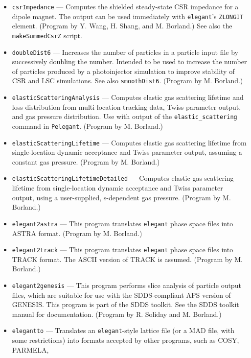 \documentclass[11pt]{article}
\begin{document}
\begin{itemize}
  (Program by X. Dong.)
\item {\tt csrImpedance} --- Computes the shielded steady-state CSR impedance for a dipole magnet.
 The output can be used immediately with {\tt elegant}'s \verb|ZLONGIT| element.
 (Program by Y. Wang, H. Shang, and M. Borland.)
 See also the {\tt makeSummedCsrZ} script.
\item {\tt doubleDist6} --- Increases the number of particles in a particle input file by
 successively doubling the number.  Intended to be used to increase the number of particles
 produced by a photoinjector simulation to improve stability of CSR and LSC simulations.
 See also {\tt smoothDist6}.
  (Program by M. Borland.)
\item {\tt elasticScatteringAnalysis} --- Computes elastic gas scattering lifetime and loss distribution from
  multi-location tracking data, Twiss parameter output, and gas pressure distribution. Use with output of the
  \verb|elastic_scattering| command in \verb|Pelegant|.
  (Program by M. Borland.)
\item {\tt elasticScatteringLifetime} --- Computes elastic gas scattering lifetime from single-location 
  dynamic acceptance and Twiss parameter output, assuming a constant gas pressure.
  (Program by M. Borland.)
\item {\tt elasticScatteringLifetimeDetailed} --- Computes elastic gas scattering lifetime from single-location 
  dynamic acceptance and Twiss parameter output, using a user-supplied, s-dependent gas pressure.
  (Program by M. Borland.)
\item {\tt elegant2astra} --- This program translates {\tt elegant} phase space files into ASTRA \cite{ASTRA} format.
  (Program by M. Borland.)
\item {\tt elegant2track} --- This program translates {\tt elegant} phase space files into TRACK \cite{TRACK} format.
  The ASCII version of TRACK is assumed.
  (Program by M. Borland.)
\item {\tt elegant2genesis} --- This program performs
        slice analysis of particle output files, which are suitable for use with
        the SDDS-compliant APS version of GENESIS\cite{GENESIS}.  This program is
        part of the SDDS toolkit.  See the SDDS toolkit
        manual for documentation. (Program by R. Soliday and M. Borland.)
\item {\tt elegantto} --- Translates an {\tt elegant}-style lattice file (or a MAD file, with
        some restrictions) into formats accepted by other programs, such as COSY, PARMELA, 

\end{itemize}
\end{document}
